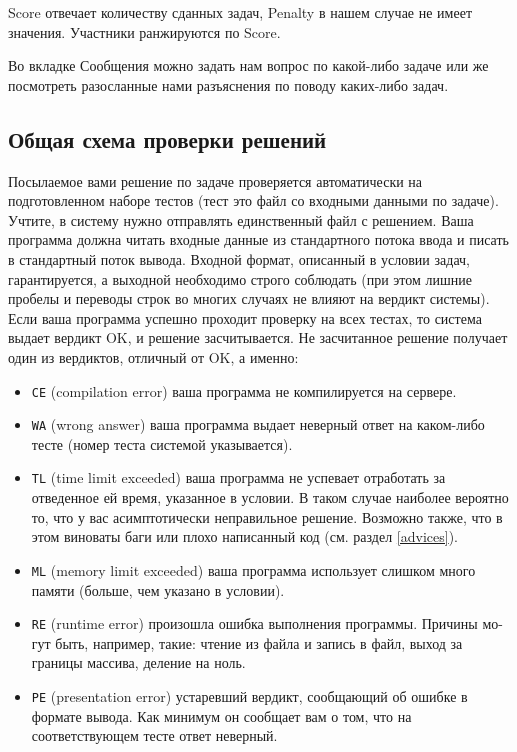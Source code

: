 \documentclass[12pt]{article}
\begin{document}
Score отвечает количеству сданных задач, Penalty в нашем случае не имеет значения. 
Участники ранжируются по Score. 

Во вкладке Сообщения можно задать нам вопрос по какой-либо задаче
или же посмотреть разосланные нами разъяснения по поводу каких-либо задач.


\subsection{Общая схема проверки решений}
\label{scheme}

Посылаемое вами решение по задаче проверяется автоматически на подготовленном 
наборе тестов (тест это файл со входными данными по задаче). Учтите,
в систему нужно отправлять единственный файл с решением. Ваша программа должна 
читать входные данные из стандартного потока ввода и писать в стандартный поток вывода. 
Входной формат, описанный в условии задач, гарантируется, а выходной
необходимо строго соблюдать (при этом лишние пробелы и переводы строк во многих
случаях не влияют на вердикт системы).
Если ваша программа успешно проходит проверку на всех тестах, то система выдает 
вердикт OK, и решение засчитывается. Не засчитанное решение получает один из
вердиктов, отличный от OK, а именно:
\begin{itemize}
\item \texttt{CE} (compilation error) ваша программа не компилируется на сервере.
\item \texttt{WA} (wrong answer) ваша программа выдает неверный ответ на каком-либо
тесте (номер теста системой указывается).
\item \texttt{TL} (time limit exceeded) ваша программа не успевает отработать за отведенное
ей время, указанное в условии. В таком случае наиболее вероятно то, что у вас
асимптотически неправильное решение. Возможно также, что в этом виноваты
баги или плохо написанный код (см. раздел \ref{advices}).
\item \texttt{ML} (memory limit exceeded) ваша программа использует слишком много памяти
(больше, чем указано в условии).
\item \texttt{RE} (runtime error) произошла ошибка выполнения программы. Причины мо-
гут быть, например, такие: чтение из файла и запись в файл, выход за границы
массива, деление на ноль.
\item \texttt{PE} (presentation error) устаревший вердикт, сообщающий об ошибке в формате
вывода. Как минимум он сообщает вам о том, что на соответствующем тесте ответ
неверный.
\end{itemize}
\end{document}
